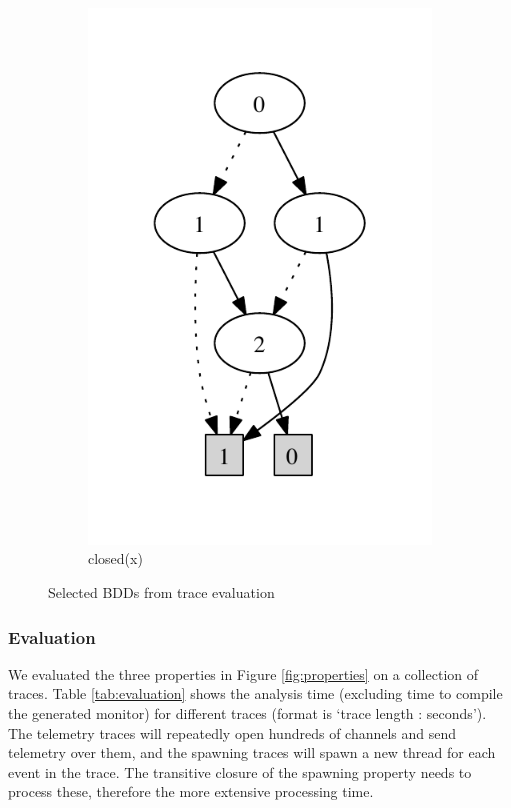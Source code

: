\begin{figure}
\begin{subfigure}[b]{0.25\textwidth}
        \includegraphics[width=\textwidth]{figures/bdd3.pdf}
        \caption{closed(x)}
        \label{fig:bdd3}
    \end{subfigure}
    \caption{Selected BDDs from trace evaluation}
    \label{fig:bdds}
\end{figure}

\subsubsection{Evaluation}

We evaluated the three properties in Figure 
\ref{fig:properties} on a collection of traces. Table \ref{tab:evaluation} shows the  
analysis time (excluding time to compile the generated 
monitor) for different traces (format is `trace length : seconds'). The telemetry traces will repeatedly open hundreds of channels and send telemetry over them, and the spawning traces will spawn a new thread for each event in the trace. The transitive closure of the spawning property needs to process these, therefore the more extensive processing time.

